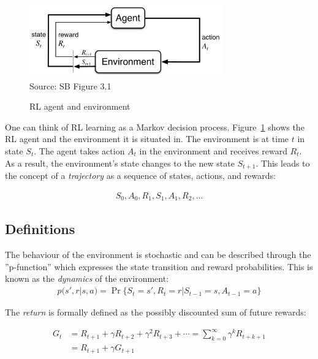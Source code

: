 \begin{figure}[h]
\centering
\includegraphics[width=0.75\textwidth]{screen3.png} \\

\scriptsize Source: SB Figure 3.1 \normalsize
\caption{RL agent and environment}
\label{fig:sb31}
\end{figure}

One can think of RL learning as a Markov decision process. Figure~\ref{fig:sb31} shows the RL agent and the environment it is situated in. The environment is at time $t$ in state $S_t$. The agent takes action $A_t$ in the environment and receives reward $R_t$. As a result, the environment's state changes to the new state $S_{t+1}$. This leads to the concept of a \emph{trajectory} as a sequence of states, actions, and rewards:

\begin{align*}S_0, A_0, R_1, S_1, A_1, R_2, \ldots
\end{align*}

\subsection{Definitions}

The behaviour of the environment is stochastic and can be described through the ''p-function'' which expresses the state transition and reward probabilities. This is known as the \emph{dynamics} of the environment: 
\begin{align}p(s', r | s, a) = \operatorname{Pr}\{S_t = s', R_t =r | S_{t-1} = s, A_{t-1} = a \} \label{eq:dynamics}
\end{align}

The \emph{return} is formally defined as the possibly discounted sum of future rewards:

\begin{align}
G_t &= R_{t+1} + \gamma R_{t+2} + \gamma^2 R_{t+3} + \cdots = \sum_{k=0}^{\infty} \gamma^k R_{t+k+1} \nonumber \\
    &= R_{t+1} + \gamma G_{t+1} \label{eq:return}
\end{align}

